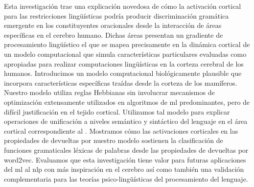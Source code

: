 Esta investigación trae una explicación novedosa de cómo la activación cortical para las restricciones lingüísticas podría producir discriminación gramática emergente en los constituyentes oracionales desde la interacción de áreas específicas en el cerebro humano.
Dichas áreas presentan un gradiente de procesamiento lingüístico el que se mapea precisamente en la dinámica  cortical de un modelo computacional que simula características particulares evaluadas como apropiadas para realizar computaciones lingüísticas en la corteza cerebral de los humanos.
Introducimos un modelo computacional biológicamente plausible que incorpora características específicas traídas desde la corteza de los mamíferos.
Nuestro modelo utiliza reglas Hebbianas sin involucrar mecanismos de optimización extensamente utilizados en algoritmos de \gls{ml} predominantes, pero de difícil justificación en el tejido cortical.
Utilizamos tal modelo para explicar operaciones de unificación a niveles semántico y sintáctico del lenguaje en el área cortical correspondiente al .
Mostramos cómo las activaciones corticales en las propiedades de  devueltas por nuestro modelo sostienen la clasificación de funciones gramaticales léxicas de palabras desde las propiedades de  devueltas por word2vec. 
Evaluamos que esta investigación tiene valor para futuras aplicaciones del \gls{ml} al \gls{nlp} con más inspiración en el cerebro así como también una validación complementaria para las teorías psico-lingüísticas del procesamiento del lenguaje.

































